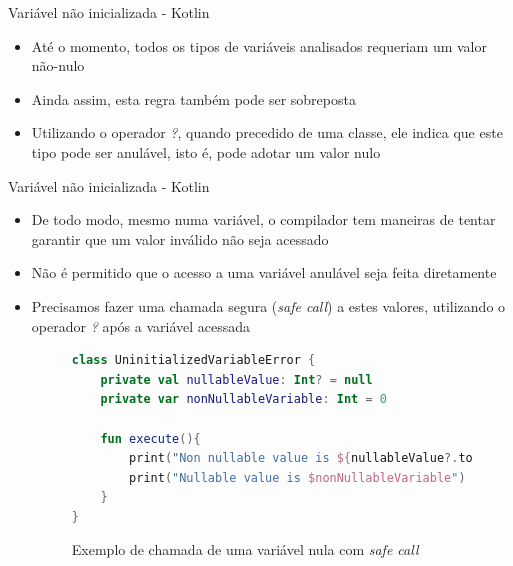 \documentclass[brazilian]{beamer}
\begin{document}
\begin{frame}{Variável não inicializada - Kotlin}
    \begin{itemize}
        \item Até o momento, todos os tipos de variáveis analisados requeriam um valor não-nulo
        \item Ainda assim, esta regra também pode ser sobreposta
        \item Utilizando o operador \emph{?}, quando precedido de uma classe, ele indica que este tipo pode ser anulável, isto é, pode adotar um valor nulo
    \end{itemize}
\end{frame}

\begin{frame}[fragile]{Variável não inicializada - Kotlin}
    \begin{itemize}
        \item De todo modo, mesmo numa variável, o compilador tem maneiras de tentar garantir que um valor inválido não seja acessado
        \item Não é permitido que o acesso a uma variável anulável seja feita diretamente
        \item Precisamos fazer uma chamada segura (\textit{safe call}) a estes valores, utilizando o operador \emph{?} após a variável acessada
        \begin{figure}[H]
            \centering
            \begin{lstlisting}[language=Kotlin]
class UninitializedVariableError {
    private val nullableValue: Int? = null
    private var nonNullableVariable: Int = 0

    fun execute(){
        print("Non nullable value is ${nullableValue?.toFloat()}")
        print("Nullable value is $nonNullableVariable")
    }
}
            \end{lstlisting}
            \caption{Exemplo de chamada de uma variável nula com \textit{safe call}}
            \label{fig:kotlin_null_variable_with_safe_call}
        \end{figure}
    \end{itemize}
\end{frame}
\end{document}
